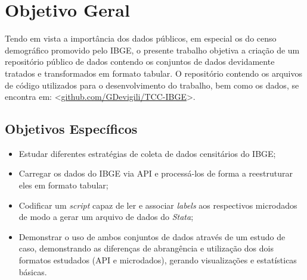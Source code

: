     



\chapter{Objetivo Geral}

    Tendo em vista a importância dos dados públicos, em especial os do censo demográfico promovido pelo IBGE, o presente trabalho objetiva a criação de um repositório público de dados contendo os conjuntos de dados devidamente tratados e transformados em formato tabular. O repositório contendo os arquivos de código utilizados para o desenvolvimento do trabalho, bem como os dados, se encontra em: <\url{github.com/GDevigili/TCC-IBGE}>.


\section{Objetivos Específicos}

\begin{itemize}
    \item Estudar diferentes estratégias de coleta de dados censitários do IBGE;
    \item Carregar os dados do IBGE via API e processá-los de forma a reestruturar eles em formato tabular;
    \item Codificar um \textit{script} capaz de ler e associar \textit{labels} aos respectivos microdados de modo a gerar um arquivo de dados do \textit{Stata};
    \item Demonstrar o uso de ambos conjuntos de dados através de um estudo de caso, demonstrando as diferenças de abrangência e utilização dos dois formatos estudados (API e microdados), gerando visualizações e estatísticas básicas.
\end{itemize}